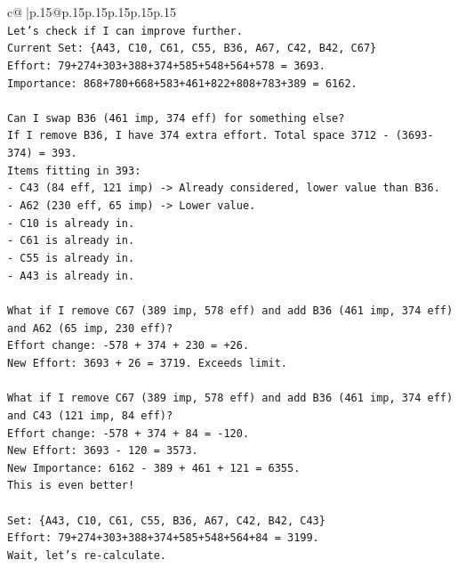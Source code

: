 \documentclass{article}
\begin{document}
{\begin{supertabular}{c@{$\;$}|p{.15\linewidth}@{}p{.15\linewidth}p{.15\linewidth}p{.15\linewidth}p{.15\linewidth}p{.15\linewidth}}
{{{\\ 
\texttt{Let's check if I can improve further.} \\
\texttt{Current Set: \{A43, C10, C61, C55, B36, A67, C42, B42, C67\}} \\
\texttt{Effort: 79+274+303+388+374+585+548+564+578 = 3693.} \\
\texttt{Importance: 868+780+668+583+461+822+808+783+389 = 6162.} \\
\\ 
\texttt{Can I swap B36 (461 imp, 374 eff) for something else?} \\
\texttt{If I remove B36, I have 374 extra effort. Total space 3712 {-} (3693{-}374) = 393.} \\
\texttt{Items fitting in 393:} \\
\texttt{{-} C43 (84 eff, 121 imp) {-}> Already considered, lower value than B36.} \\
\texttt{{-} A62 (230 eff, 65 imp) {-}> Lower value.} \\
\texttt{{-} C10 is already in.} \\
\texttt{{-} C61 is already in.} \\
\texttt{{-} C55 is already in.} \\
\texttt{{-} A43 is already in.} \\
\\ 
\texttt{What if I remove C67 (389 imp, 578 eff) and add B36 (461 imp, 374 eff) and A62 (65 imp, 230 eff)?} \\
\texttt{Effort change: {-}578 + 374 + 230 = +26.} \\
\texttt{New Effort: 3693 + 26 = 3719. Exceeds limit.} \\
\\ 
\texttt{What if I remove C67 (389 imp, 578 eff) and add B36 (461 imp, 374 eff) and C43 (121 imp, 84 eff)?} \\
\texttt{Effort change: {-}578 + 374 + 84 = {-}120.} \\
\texttt{New Effort: 3693 {-} 120 = 3573.} \\
\texttt{New Importance: 6162 {-} 389 + 461 + 121 = 6355.} \\
\texttt{This is even better!} \\
\\ 
\texttt{Set: \{A43, C10, C61, C55, B36, A67, C42, B42, C43\}} \\
\texttt{Effort: 79+274+303+388+374+585+548+564+84 = 3199.} \\
\texttt{Wait, let's re{-}calculate.} \\
}}}
\end{supertabular}}
\end{document}
